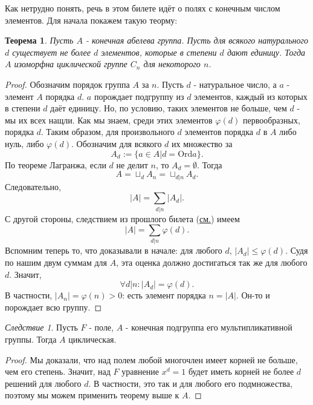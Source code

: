 \documentclass[a4paper,100pt]{article}
\theoremstyle{indented}
\newtheorem{theorem}{Теорема}
\theoremstyle{definition}
\theoremstyle{remark}
\newtheorem{cons}{Следствие}
\begin{document}
Как нетрудно понять, речь в этом билете идёт о полях с конечным числом элементов. Для начала покажем такую теорму:

\begin{theorem}
    Пусть $A$ - конечная абелева группа. Пусть для всякого натурального $d$ существует не более $d$ элементов, которые в степени $d$ дают единицу. Тогда $A$ изоморфна циклической группе $C_n$ для некоторого $n$. 
\end{theorem}

\begin{proof}
    Обозначим порядок группа $A$ за $n$. Пусть $d$ - натуральное число, а $a$ - элемент $A$ порядка $d$. $a$ порождает подгруппу из $d$ элементов, каждый из которых в степени $d$ даёт единицу. Но, по условию, таких элементов не больше, чем $d$ - мы их всех нащли. Как мы знаем, среди этих элементов $\varphi(d)$ первообразных, порядка $d$. Таким образом, для произвольного $d$ элементов порядка $d$ в $A$ либо нуль, либо $\varphi(d)$. Обозначим для всякого $d$ их множество за
    \[
        A_d:=\{a\in A\vert d=\text{Ord}a\}.
    \]
    По теореме Лагранжа, если $d$ не делит $n$, то $A_d=\emptyset$. Тогда
    \[
        A=\sqcup_d A_n=\sqcup_{d\vert n}A_d.
    \]
    Следовательно, 
    \[
        \vert A\vert =\sum_{d\vert n}\vert A_d\vert.
    \]
    С другой стороны, следствием из прошлого билета (\hyperlink{t5}{см.}) имеем 
    \[
        \vert A\vert =\sum_{d\vert n}\varphi(d).
    \]
    Вспомним теперь то, что доказывали в начале: для любого $d$, $\vert A_d\vert\leq \varphi(d)$. Судя по нашим двум суммам для $A$, эта оценка должно достигаться так же для любого $d$. Значит, 
    \[
        \forall d\vert n:\vert A_d\vert=\varphi(d).
    \]
    В частности, $\vert A_n\vert=\varphi(n)>0$: есть элемент порядка $n=\vert A\vert$. Он-то и порождает всю группу.
\end{proof}

\begin{cons}
    Пусть $F$ - поле, $A$ - конечная подгруппа его мультипликативной группы. Тогда $A$ циклическая.
\end{cons}

\begin{proof}
    Мы доказали, что над полем любой многочлен имеет корней не больше, чем его степень. Значит, над $F$ уравнение $x^d=1$ будет иметь корней не более $d$ решений для любого $d$. В частности, это так и для любого его подмножества, поэтому мы можем применить теорему выше к $A$.
\end{proof}
\end{document}
